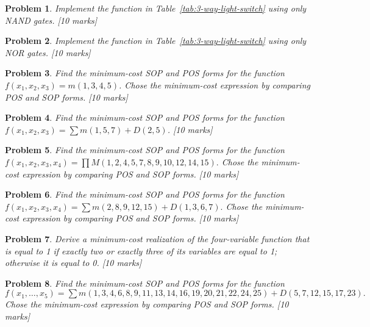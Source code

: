 \documentclass[twocolumn]{article}
\newtheorem{prob}{Problem}
\begin{document}
\begin{prob}
 Implement the function in Table~\ref{tab:3-way-light-switch} using only NAND
 gates. [10 marks]
\end{prob}

\begin{prob}
 Implement the function in Table~\ref{tab:3-way-light-switch} using only NOR
 gates. [10 marks]
\end{prob}


\begin{prob}
Find the minimum-cost SOP and POS forms for the function $f(x_1 , x_2 , x_3 ) =
m(1, 3, 4, 5)$.  Chose the minimum-cost expression by comparing POS and SOP forms. [10 marks]
\label{prob:237}
\end{prob}

\begin{prob}
Find the minimum-cost SOP and POS forms for the function $f(x_1 , x_2 , x_3) =
\sum m(1, 5, 7) + D(2, 5)$.  [10 marks]
\end{prob}

\begin{prob}
Find the minimum-cost SOP and POS forms for the function $f(x_1 , x_2 , x_3,
x_4) = \prod M(1, 2, 4, 5, 7, 8, 9, 10, 12, 14, 15).$  Chose the minimum-cost
expression by comparing POS and SOP forms. [10 marks]
\end{prob}

\begin{prob}
Find the minimum-cost SOP and POS forms for the function $f(x_1 , x_2 , x_3, x_4) =
\sum m(2, 8, 9, 12, 15) + D(1, 3, 6, 7).$  Chose the minimum-cost expression
by comparing POS and SOP forms. [10 marks]
\end{prob}

\begin{prob}
Derive a minimum-cost realization of the four-variable function that is equal to 1 if exactly
two or exactly three of its variables are equal to 1; otherwise it is equal to
0.  [10 marks]
\end{prob}

\begin{prob}
  Find the minimum-cost SOP and POS forms for the function $f(x_1 , \dots, x_5) =
  \sum m(1, 3, 4, 6, 8, 9, 11, 13, 14, 16, 19, 20, 21, 22, 24, 25) + D(5, 7,
  12, 15, 17, 23).$  Chose the minimum-cost expression by comparing POS and SOP forms. [10 marks]
\end{prob}
\end{document}

